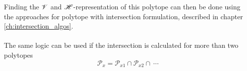 Finding the $\mathscr{V}$ and $\mathscr{H}$-representation of this polytope can then be done using the approaches for polytope with intersection formulation, described in chapter \ref{ch:intersection_algos}.


\paragraph*{} The same logic can be used if the intersection is calculated for more than two polytopes 
\begin{equation}
    \mathcal{P}_x = \mathcal{P}_{x1} \cap \mathcal{P}_{x2} \cap ~\cdots
\end{equation}
